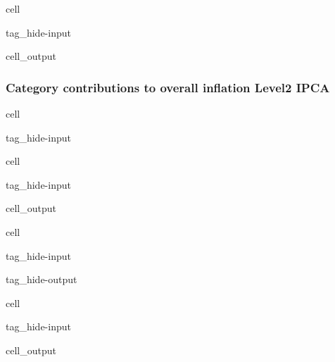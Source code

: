 \documentclass[letterpaper,10pt,english]{jupyterBook}
\begin{document}
\begin{sphinxuseclass}{cell}
\begin{sphinxuseclass}{tag_hide-input}\begin{sphinxVerbatimOutput}

\begin{sphinxuseclass}{cell_output}
\end{sphinxuseclass}\end{sphinxVerbatimOutput}

\end{sphinxuseclass}
\end{sphinxuseclass}

\subsubsection{Category contributions to overall inflation \sphinxhyphen{} Level\sphinxhyphen{}2 IPCA}
\label{\detokenize{code/notebooks/inflation:category-contributions-to-overall-inflation-level-2-ipca}}
\begin{sphinxuseclass}{cell}
\begin{sphinxuseclass}{tag_hide-input}
\end{sphinxuseclass}
\end{sphinxuseclass}
\begin{sphinxuseclass}{cell}
\begin{sphinxuseclass}{tag_hide-input}\begin{sphinxVerbatimOutput}

\begin{sphinxuseclass}{cell_output}
\end{sphinxuseclass}\end{sphinxVerbatimOutput}

\end{sphinxuseclass}
\end{sphinxuseclass}
\begin{sphinxuseclass}{cell}
\begin{sphinxuseclass}{tag_hide-input}
\begin{sphinxuseclass}{tag_hide-output}
\end{sphinxuseclass}
\end{sphinxuseclass}
\end{sphinxuseclass}
\begin{sphinxuseclass}{cell}
\begin{sphinxuseclass}{tag_hide-input}\begin{sphinxVerbatimOutput}

\begin{sphinxuseclass}{cell_output}
\end{sphinxuseclass}\end{sphinxVerbatimOutput}

\end{sphinxuseclass}
\end{sphinxuseclass}
\end{document}
